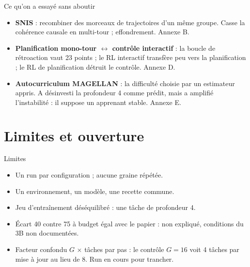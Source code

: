 \documentclass[aspectratio=169,11pt]{beamer}
\begin{document}
\begin{frame}{Ce qu'on a essayé sans aboutir}
\begin{itemize}
    \item \textbf{SNIS} : recombiner des morceaux de trajectoires d'un même groupe. Casse la cohérence causale en multi-tour ; effondrement. Annexe B.
    \item \textbf{Planification mono-tour $\leftrightarrow$ contrôle interactif} : la boucle de rétroaction vaut 23 points ; le RL interactif transfère peu vers la planification ; le RL de planification détruit le contrôle. Annexe D.
    \item \textbf{Autocurriculum MAGELLAN} : la difficulté choisie par un estimateur appris. A désinvesti la profondeur 4 comme prédit, mais a amplifié l'instabilité : il suppose un apprenant stable. Annexe E.
\end{itemize}
\end{frame}

\section{Limites et ouverture}

\begin{frame}{Limites}
\begin{itemize}
    \item Un run par configuration ; aucune graine répétée.
    \item Un environnement, un modèle, une recette commune.
    \item Jeu d'entraînement déséquilibré : une tâche de profondeur 4.
    \item Écart 40 contre 75 à budget égal avec le papier : non expliqué, conditions du 3B non documentées.
    \item Facteur confondu $G$ $\times$ tâches par pas : le contrôle $G=16$ voit 4 tâches par mise à jour au lieu de 8. Run en cours pour trancher.
\end{itemize}
\end{frame}
\end{document}
